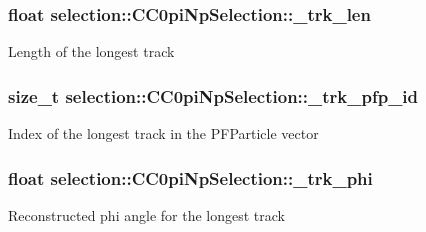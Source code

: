 \subsubsection[{\texorpdfstring{\+\_\+trk\+\_\+len}{_trk_len}}]{\setlength{\rightskip}{0pt plus 5cm}float selection\+::\+C\+C0pi\+Np\+Selection\+::\+\_\+trk\+\_\+len\hspace{0.3cm}{\ttfamily [private]}}\hypertarget{classselection_1_1CC0piNpSelection_aab7945993678b44d7100abac6cc71655}{}\label{classselection_1_1CC0piNpSelection_aab7945993678b44d7100abac6cc71655}
Length of the longest track 
\subsubsection[{\texorpdfstring{\+\_\+trk\+\_\+pfp\+\_\+id}{_trk_pfp_id}}]{\setlength{\rightskip}{0pt plus 5cm}size\+\_\+t selection\+::\+C\+C0pi\+Np\+Selection\+::\+\_\+trk\+\_\+pfp\+\_\+id\hspace{0.3cm}{\ttfamily [private]}}\hypertarget{classselection_1_1CC0piNpSelection_a641e7e656a28a5b31a5c8ab21dad9d3b}{}\label{classselection_1_1CC0piNpSelection_a641e7e656a28a5b31a5c8ab21dad9d3b}
Index of the longest track in the P\+F\+Particle vector 
\subsubsection[{\texorpdfstring{\+\_\+trk\+\_\+phi}{_trk_phi}}]{\setlength{\rightskip}{0pt plus 5cm}float selection\+::\+C\+C0pi\+Np\+Selection\+::\+\_\+trk\+\_\+phi\hspace{0.3cm}{\ttfamily [private]}}\hypertarget{classselection_1_1CC0piNpSelection_a85a6029e249e3ff20ea6d8eaabf22142}{}\label{classselection_1_1CC0piNpSelection_a85a6029e249e3ff20ea6d8eaabf22142}
Reconstructed phi angle for the longest track 
